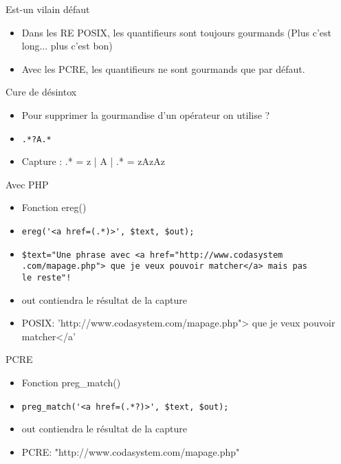 \begin{frame}[containsverbatim]{\ftitle}
\def\blocktitle{Est-un vilain défaut}
\begin{block}{\blocktitle}
\begin{itemize}
\item Dans les RE POSIX, les quantifieurs sont toujours gourmands (Plus c'est long... plus c'est bon)
\item Avec les PCRE, les quantifieurs ne sont gourmands que par défaut.
\end{itemize}
\end{block}

\def\blocktitle{Cure de désintox}
\begin{block}{\blocktitle}
\begin{itemize}
\item Pour supprimer la gourmandise d'un opérateur on utilise ?
\item \verb!.*?A.*!
\item Capture : .* = z | A | .* = zAzAz
\end{itemize}
\end{block}
\end{frame}


\begin{frame}[containsverbatim]{\ftitle}
\def\blocktitle{Avec PHP}
\begin{block}{\blocktitle}
\begin{itemize}
\item Fonction ereg()
\item \verb!ereg('<a href=(.*)>', $text, $out);!
\item \begin{verbatim}$text="Une phrase avec <a href="http://www.codasystem
.com/mapage.php"> que je veux pouvoir matcher</a> mais pas 
le reste"! \end{verbatim}%
\item out contiendra le résultat de la capture
\item POSIX: 'http://www.codasystem.com/mapage.php"> que je veux pouvoir matcher</a'
\end{itemize}
\end{block}

\def\blocktitle{PCRE}
\begin{block}{\blocktitle}
\begin{itemize}
\item Fonction preg\_match()
\item \verb!preg_match('<a href=(.*?)>', $text, $out);!
\item out contiendra le résultat de la capture
\item PCRE: "http://www.codasystem.com/mapage.php"
\end{itemize}
\end{block}
\end{frame}

